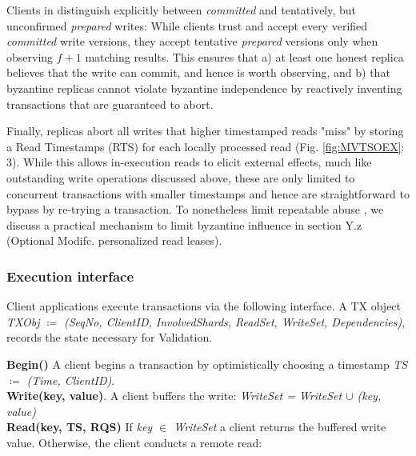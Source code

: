 Clients in \sys distinguish explicitly between \textit{committed} and tentatively, but unconfirmed \textit{prepared} writes: While clients trust and accept every verified \textit{committed} write versions, they accept tentative \textit{prepared} versions only when observing $f+1$ matching results. This ensures that a) at least one honest replica believes that the write can commit, and hence is worth observing, and b) that byzantine replicas cannot violate byzantine independence by reactively inventing transactions that are guaranteed to abort.

Finally, \sys replicas abort all writes that higher timestamped reads "miss" by storing a Read Timestamps (RTS) for each locally processed read (Fig. \ref{fig:MVTSOEX}: 3). While this allows in-execution reads to elicit external effects, much like outstanding write operations discussed above, these are only limited to concurrent transactions with smaller timestamps and hence are straightforward to bypass by re-trying a transaction. To nonetheless limit repeatable abuse , we discuss a practical mechanism to limit byzantine influence in section Y.z (Optional Modifc. personalized read leases).



\subsubsection{Execution interface}
Client applications execute transactions via the following interface. A TX object \textit{TXObj $\coloneqq$ (SeqNo, ClientID, InvolvedShards, ReadSet, WriteSet, Dependencies)}, records the state necessary for Validation.

\textbf{Begin()} A client begins a transaction by optimistically choosing a timestamp \textit{TS $\coloneqq$ (Time, ClientID)}. \\
\textbf{Write(key, value)}. A client buffers the write: \textit{WriteSet = WriteSet $\cup$ (key, value)}\\
\textbf{Read(key, TS, RQS)} 
If \textit{key $\in$ WriteSet} a client returns the buffered write value. Otherwise, the client conducts a remote read:

